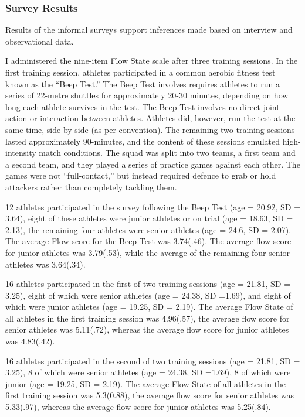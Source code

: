 \begin{CJK}{UTF8}{gbsn}
\subsubsection{Survey Results}

Results of the informal surveys support inferences made based on interview and observational data.

I administered the nine-item Flow State scale after three training sessions.  In the first training session, athletes participated in a common aerobic fitness test known as the ``Beep Test.''  The Beep Test involves requires athletes to run a series of 22-metre shuttles for approximately 20-30 minutes, depending on how long each athlete survives in the test.  The Beep Test involves no direct joint action or interaction between athletes.  Athletes did, however, run the test at the same time, side-by-side (as per convention).  The remaining two training sessions lasted approximately 90-minutes, and the content of these sessions emulated high-intensity match conditions.  The squad was split into two teams, a first team and a second team, and they played a series of practice games against each other.  The games were not ``full-contact,'' but instead required defence to grab or hold attackers rather than completely tackling them.

12 athletes participated in the survey following the Beep Test (age = 20.92, SD = 3.64), eight of these athletes were junior athletes or on trial (age = 18.63, SD = 2.13), the remaining four athletes were senior athletes (age = 24.6, SD = 2.07). The average Flow score for the Beep Test was 3.74(.46).  The average flow score for junior athletes was 3.79(.53), while the average of the remaining four senior athletes was 3.64(.34).

16 athletes participated in the first of two training sessions (age = 21.81, SD = 3.25), eight of which were senior athletes (age = 24.38, SD =1.69), and eight of which were junior athletes (age = 19.25, SD = 2.19). The average Flow State of all athletes in the first training session was 4.96(.57), the average flow score for senior athletes was 5.11(.72), whereas the average flow score for junior athletes was 4.83(.42).

16 athletes participated in the second of two training sessions (age = 21.81, SD = 3.25), 8 of which were senior athletes (age = 24.38, SD =1.69), 8 of which were junior (age = 19.25, SD = 2.19). The average Flow State of all athletes in the first training session was 5.3(0.88), the average flow score for senior athletes was 5.33(.97), whereas the average flow score for junior athletes was 5.25(.84).


\end{CJK}
